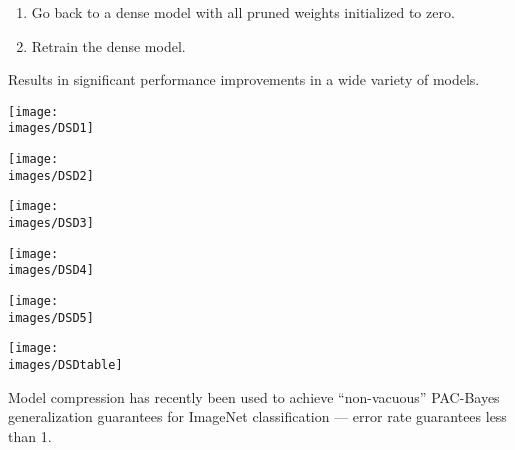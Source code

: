 {\begin{enumerate}
  \vfill
\item Go back to a dense model with all pruned weights initialized to zero.

  \vfill
\item  Retrain the dense model.
\end{enumerate}

Results in significant performance improvements in a wide variety of models.


\vfill
\centerline{\texttt{[image: \\images/DSD1]}}


\vfill
\centerline{\texttt{[image: \\images/DSD2]}}


\vfill
\centerline{\texttt{[image: \\images/DSD3]}}


\vfill
\centerline{\texttt{[image: \\images/DSD4]}}


\vfill
\centerline{\texttt{[image: \\images/DSD5]}}


\vfill
\centerline{\texttt{[image: \\images/DSDtable]}}




Model compression has recently been used to achieve ``non-vacuous'' PAC-Bayes generalization guarantees for ImageNet classification
--- error rate guarantees less than 1.

}
